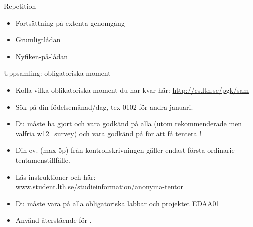 \newcommand{\legend}[2][]{
    \begin{scope}[#1]
    \path
        \foreach \n/\s in {#2}
            {
                  ++(0,-10pt) node[\s,legend box] {} +(5pt,0) node[legend label] {\n}
            }
    ;
    \end{scope}
}


\ifkompendium\else


\begin{Slide}{Repetition}
  \begin{itemize}
    \item Fortsättning på extenta-genomgång
    \item Grumligtlådan
    \item Nyfiken-på-lådan
  \end{itemize}
\end{Slide}


\begin{Slide}{Uppsamling: obligatoriska moment}\SlideFontSmall
\begin{itemize}
\item Kolla vilka oblikatoriska moment du har kvar här:
\url{http://cs.lth.se/pgk/sam}
\item Sök på din födelsemånad/dag, tex 0102 för andra januari.
\item Du måste ha gjort  och vara godkänd på alla  (utom rekommenderade men valfria w12\_survey) och vara godkänd på  för att få tentera !
\item Din ev.  (max 5p) från kontrollskrivningen gäller endast första ordinarie tentamenstillfälle.
\item Läs  instruktioner  och  här: \\
\href{http://www.student.lth.se/studieinformation/anonyma-tentor/}{www.student.lth.se/studieinformation/anonyma-tentor}
\item Du måste vara  på alla obligatoriska labbar och projektet  \href{http://cs.lth.se/edaa01vt}{EDAA01}
\item Använd återstående  för .
\end{itemize}
\end{Slide}

